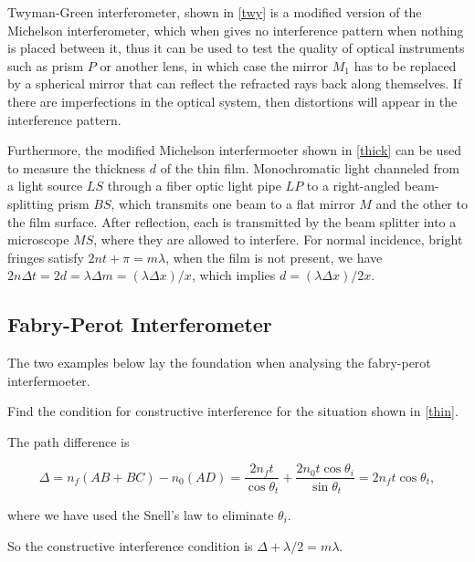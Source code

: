 \documentclass[english,a4paper,12pt]{report}
\begin{document}
Twyman-Green interferometer, shown in \cref{twy} is a modified version of the Michelson interferometer, which when gives no interference pattern when nothing is placed between it, thus it can be used to test the quality of optical instruments such as prism \(P\) or another lens, in which case the mirror \(M_1 \) has to be replaced by a spherical mirror that can reflect the refracted rays back along themselves. If there are imperfections in the optical system, then distortions will appear in the interference pattern. 

Furthermore, the modified Michelson interfermoeter shown in \cref{thick} can be used to measure the thickness \(d\) of the thin film. Monochromatic light channeled from a light source \(LS\) through a fiber optic light pipe \(LP\) to a right-angled beam-splitting prism \(BS\), which transmits one beam to a flat mirror \(M\) and the other to the film surface. After reflection, each is transmitted by the beam splitter into a microscope \(MS\), where they are allowed to interfere. For normal incidence, bright fringes satisfy \(2nt + \pi = m\lambda \), when the film is not present, we have \(2n\Delta t = 2d = \lambda \Delta m = (\lambda \Delta x)/x\), which implies \(d = (\lambda \Delta x)/2x\).   





\subsection{Fabry-Perot Interferometer}

The two examples below lay the foundation when analysing the fabry-perot interfermoeter.

{Find the condition for constructive interference for the situation shown in \cref{thin}.}
{The path difference is 

\begin{equation}
    \Delta = n_{f}(AB+BC)-n_0 (AD) = \frac{2n_{f}t }{\cos \theta _{t} } + \frac{2n_0 t\cos \theta _{i} }{\sin \theta _{t} } = 2n_{f}t \cos \theta _{t},      
\end{equation}

where we have used the Snell's law to eliminate \(\theta _{i} \).

So the constructive interference condition is \(\Delta + \lambda /2 = m\lambda  \). 
} 
\end{document}
